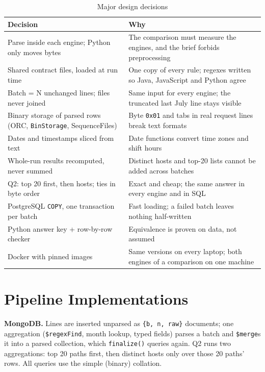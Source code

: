 \documentclass[conference]{IEEEtran}
\newcommand{\code}[1]{\texttt{\small #1}}
\begin{document}
\begin{table}[h]
\caption{Major design decisions}
\label{tab:decisions}
\centering
\scriptsize
\setlength{\tabcolsep}{3pt}
\begin{tabular}{@{}L{0.40\columnwidth}L{0.55\columnwidth}@{}}
\toprule
Decision & Why \\
\midrule
Parse inside each engine; Python only moves bytes & The comparison must measure the engines, and the brief forbids preprocessing \\
Shared contract files, loaded at run time & One copy of every rule; regexes written so Java, JavaScript and Python agree \\
Batch = N unchanged lines; files never joined & Same input for every engine; the truncated last July line stays visible \\
Binary storage of parsed rows (ORC, \texttt{BinStorage}, SequenceFiles) & Byte \texttt{0x01} and tabs in real request lines break text formats \\
Dates and timestamps sliced from text & Date functions convert time zones and shift hours \\
Whole-run results recomputed, never summed & Distinct hosts and top-20 lists cannot be added across batches \\
Q2: top 20 first, then hosts; ties in byte order & Exact and cheap; the same answer in every engine and in SQL \\
PostgreSQL \texttt{COPY}, one transaction per batch & Fast loading; a failed batch leaves nothing half-written \\
Python answer key + row-by-row checker & Equivalence is proven on data, not assumed \\
Docker with pinned images & Same versions on every laptop; both engines of a comparison on one machine \\
\bottomrule
\end{tabular}
\end{table}

\section{Pipeline Implementations}
\textbf{MongoDB.} Lines are inserted unparsed as \code{\{b, n, raw\}} documents; one aggregation
(\code{\$regexFind}, month lookup, typed fields) parses a batch and \code{\$merge}s it into a
parsed collection, which \code{finalize()} queries again. Q2 runs two aggregations: top 20 paths
first, then distinct hosts only over those 20 paths' rows. All queries use the simple (binary)
collation.
\end{document}
